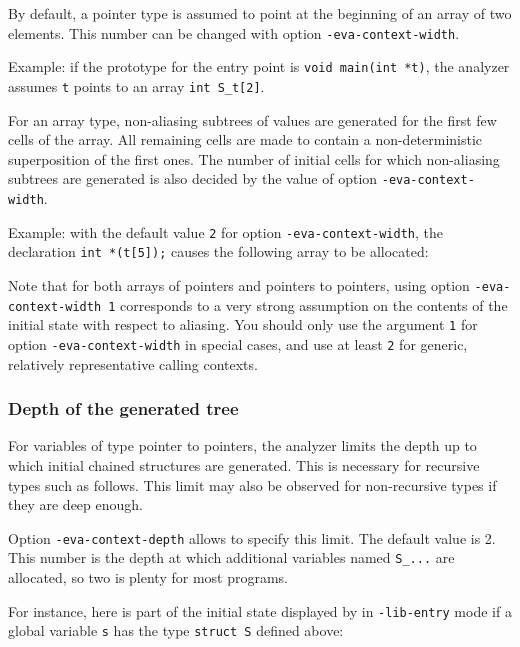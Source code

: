 \documentclass{frama-c-book}
\begin{document}
By default, a pointer type is assumed to point at the beginning
of an array of two elements. This number can be changed with option
\lstinline|-eva-context-width|.

Example: if the prototype for the entry point is \lstinline|void main(int *t)|,
the analyzer assumes \lstinline|t| points to an array \lstinline|int S_t[2]|.

For an array type, non-aliasing subtrees of values
are generated for the first
few cells of the array. All remaining cells are made to contain a
non-deterministic superposition of the first ones. The number
of initial cells for which non-aliasing subtrees are generated is
also decided by the value of option \lstinline|-eva-context-width|.

Example: with the default value \lstinline|2| for option
\lstinline|-eva-context-width|, the declaration \lstinline|int *(t[5]);|
causes the following array to be allocated:

Note that for both arrays of pointers and pointers to pointers,
using option \lstinline|-eva-context-width 1| corresponds to a very strong
assumption on the contents of the initial state with respect to aliasing.
You should only use the argument \lstinline|1| for
option \lstinline|-eva-context-width| in special cases, and use at least
\lstinline|2| for generic, relatively representative calling contexts.

\subsubsection{Depth of the generated tree}

For variables of type pointer to pointers, the analyzer limits the depth up
to which initial chained structures are generated.
This is necessary for recursive types such as follows.
This limit may also be observed for non-recursive types if they are deep enough.

Option \lstinline|-eva-context-depth| allows to specify this limit.
The default value is 2. This number is the depth at which
additional variables named \lstinline|S_...| are allocated, so
two is plenty for most programs.

For instance, here is part of the initial state displayed by \Eva{}
in \lstinline|-lib-entry| mode if a global variable \lstinline|s|
has the type \lstinline|struct S| defined above:
\end{document}
